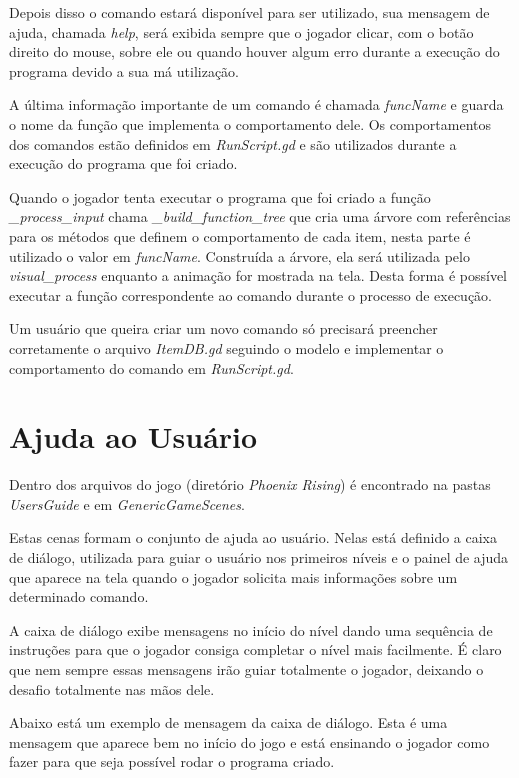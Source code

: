Depois disso o comando estará disponível para ser utilizado, sua
mensagem de ajuda, chamada \textit{help}, será exibida sempre que o jogador 
clicar, com o botão direito do mouse, sobre ele ou quando houver algum 
erro durante a execução do programa devido a sua má utilização.

A última informação importante de um comando é chamada \textit{funcName} e 
guarda o nome da função que implementa o comportamento dele. Os comportamentos
dos comandos estão definidos em \textit{RunScript.gd} e são utilizados durante
a execução do programa que foi criado.

Quando o jogador tenta executar o programa que foi criado a função 
\textit{\_process\_input} chama \textit{\_build\_function\_tree} que 
cria uma árvore com referências para os métodos que definem o comportamento de 
cada item, nesta parte é utilizado o valor em \textit{funcName}. Construída a 
árvore, ela será utilizada pelo \textit{visual\_process} enquanto a animação 
for mostrada na tela. Desta forma é possível executar a função correspondente ao 
comando durante o processo de execução.

Um usuário que queira criar um novo comando só precisará preencher corretamente 
o arquivo \textit{ItemDB.gd} seguindo o modelo e
implementar o comportamento do comando em \textit{RunScript.gd}.

\section{Ajuda ao Usuário}

Dentro dos arquivos do jogo (diretório \textit{Phoenix Rising}) é encontrado na
pastas \textit{UsersGuide} e em \textit{GenericGameScenes}.

Estas cenas formam o conjunto de ajuda ao usuário. Nelas está definido a caixa 
de diálogo, utilizada para guiar o usuário nos primeiros níveis e o painel de 
ajuda que aparece na tela quando o jogador solicita mais informações sobre um 
determinado comando.

A caixa de diálogo exibe mensagens no início do nível dando uma sequência de 
instruções para que o jogador consiga completar o nível mais facilmente. É claro 
que nem sempre essas mensagens irão guiar totalmente o jogador, deixando o 
desafio totalmente nas mãos dele.

Abaixo está um exemplo de mensagem da caixa de diálogo. Esta é uma mensagem que
aparece bem no início do jogo e está ensinando o jogador como fazer para que 
seja possível rodar o programa criado.

